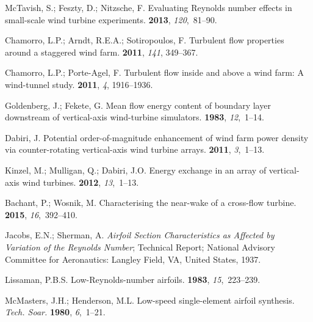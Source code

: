 \documentclass[energies,article,accept,moreauthors,pdftex,10pt,a4paper]{mdpi}
\theoremstyle{mdpi}
\newcounter{ex}
\newcounter{re}
\begin{document}
\begin{thebibliography}{999}
McTavish, S.; Feszty, D.; Nitzsche, F. \newblock Evaluating {R}eynolds number
effects in small-scale wind turbine experiments.  {\bf 2013}, {\em 120},~81--90.

 Chamorro, L.P.; Arndt, R.E.A.; Sotiropoulos, F.
\newblock Turbulent flow properties around a staggered wind farm.  {\bf 2011}, \emph{141}, 349--367.

 Chamorro, L.P.;
Porte-Agel, F. \newblock Turbulent flow inside and above a wind farm: A
wind-tunnel study.  {\bf 2011}, {\em 4}, 1916--1936.

 Goldenberg, J.; Fekete, G.
\newblock Mean flow energy content of boundary layer downstream of vertical-axis
wind-turbine simulators.  {\bf 1983},
{\em 12},~1--14.

 Dabiri, J. \newblock Potential
order-of-magnitude enhancement of wind farm power density via counter-rotating
vertical-axis wind turbine arrays. 
{\bf 2011}, {\em 3},~1--13.

Kinzel, M.; Mulligan, Q.; Dabiri, J.O. \newblock Energy exchange in an array of
vertical-axis wind turbines.  {\bf 2012}, {\em
    13},~1--13.

 Bachant, P.; Wosnik, M.
\newblock Characterising the near-wake of a cross-flow turbine.  {\bf 2015}, {\em 16},~392--410.

 Jacobs, E.N.; Sherman, A.
\newblock \emph{Airfoil Section Characteristics as Affected by Variation of the
    Reynolds Number}; \newblock Technical Report; National Advisory Committee for
Aeronautics: Langley Field, VA, United States, 1937.

 Lissaman, P.B.S. \newblock
Low-{R}eynolds-number airfoils.  {\bf
    1983}, {\em 15},~223--239.

 McMasters, J.H.;
Henderson, M.L. \newblock Low-speed single-element airfoil synthesis. \newblock
{\em Tech. Soar.} {\bf 1980}, {\em 6},~1--21.


\end{thebibliography}
\end{document}
